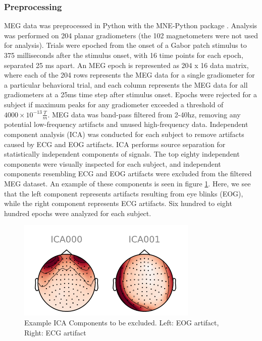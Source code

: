 \documentclass[../main.tex]{subfiles}
\begin{document}
\subsubsection*{Preprocessing}
MEG data was preprocessed in Python with the MNE-Python package \citep{mne}. Analysis was performed on 204 planar gradiometers (the 102 magnetometers were not used for analysis). Trials were epoched from the onset of a Gabor patch stimulus to 375 milliseconds after the stimulus onset, with 16 time points for each epoch, separated 25 ms apart. An MEG epoch is represented as 204 x 16 data matrix, where each of the 204 rows represents the MEG data for a single gradiometer for a particular behavioral trial, and each column represents the MEG data for all gradiometers at a 25ms time step after stimulus onset. Epochs were rejected for a subject if maximum peaks for any gradiometer exceeded a threshold of $4000\times10^{-13}  \frac{T}{m}$. MEG data was band-pass filtered from 2-40hz, removing any potential low-frequency artifacts and unused high-frequency data. Independent component analysis (ICA) was conducted for each subject to remove artifacts caused by ECG and EOG artifacts. ICA performs source separation for statistically independent components of signals. The top eighty independent components were visually inspected for each subject, and independent components resembling ECG and EOG artifacts were excluded from the filtered MEG dataset. An example of these components is seen in figure \ref{ica_exclude}. Here, we see that the left component represents artifacts resulting from eye blinks (EOG), while the right component represents ECG artifacts.  Six hundred to eight hundred epochs were analyzed for each subject.

\begin{figure}
    \centering
    \includegraphics{figures/methods/ica_figure.PNG}
    \caption{Example ICA Components to be excluded. Left: EOG artifact, Right: ECG artifact}
    \label{ica_exclude}
\end{figure}
\end{document}
